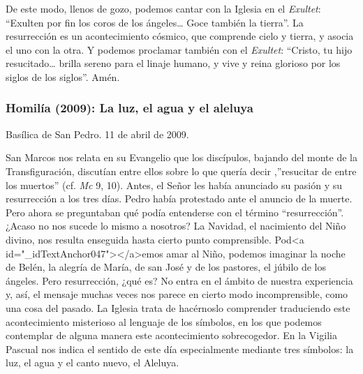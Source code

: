 			\begin{body}De este modo, llenos de gozo, podemos cantar con la Iglesia en el \textit{Exultet}: “Exulten por fin los coros de los ángeles… Goce también la tierra”. La resurrección es un acontecimiento cósmico, que comprende cielo y tierra, y asocia el uno con la otra. Y podemos proclamar también con el \textit{Exultet}: “Cristo, tu hijo resucitado… brilla sereno para el linaje humano, y vive y reina glorioso por los siglos de los siglos”. Amén.\end{body}
			
			\subsubsection{Homilía (2009): La luz, el agua y el aleluya}
			
			\begin{referencia}Basílica de San Pedro. 11 de abril de 2009.\end{referencia}
			
			\begin{body}San Marcos nos relata en su Evangelio que los discípulos, bajando del monte de la Transfiguración, discutían entre ellos sobre lo que quería decir ,”resucitar de entre los muertos” (cf. \textit{Mc} 9, 10). Antes, el Señor les había anunciado su pasión y su resurrección a los tres días. Pedro había protestado ante el anuncio de la muerte. Pero ahora se preguntaban qué podía entenderse con el término “resurrección”. ¿Acaso no nos sucede lo mismo a nosotros? La Navidad, el nacimiento del Niño divino, nos resulta enseguida hasta cierto punto comprensible. Pod<a id="_idTextAnchor047"></a>emos amar al Niño, podemos imaginar la noche de Belén, la alegría de María, de san José y de los pastores, el júbilo de los ángeles. Pero resurrección, ¿qué es? No entra en el ámbito de nuestra experiencia y, así, el mensaje muchas veces nos parece en cierto modo incomprensible, como una cosa del pasado. La Iglesia trata de hacérnoslo comprender traduciendo este acontecimiento misterioso al lenguaje de los símbolos, en los que podemos contemplar de alguna manera este acontecimiento sobrecogedor. En la Vigilia Pascual nos indica el sentido de este día especialmente mediante tres símbolos: la luz, el agua y el canto nuevo, el Aleluya.\end{body}
			
